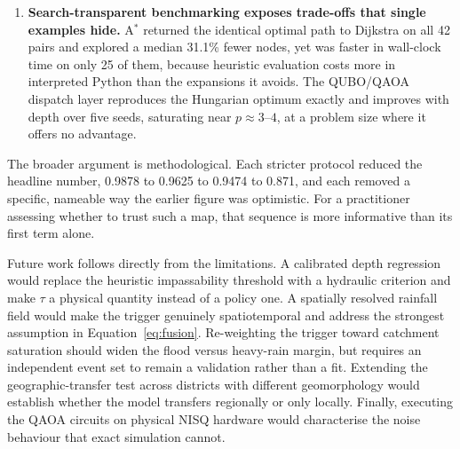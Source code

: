 \documentclass[journal]{IEEEtran}
\begin{document}
\begin{enumerate}
      pairs at $\tau\ge0.65$, $0.55$--$0.60$ and $\le0.50$. $\tau$ should be set
      by policy on acceptable risk, not by convention.
\item \textbf{Search-transparent benchmarking exposes trade-offs that single
      examples hide.} A$^\ast$ returned the identical optimal path to Dijkstra on
      all 42 pairs and explored a median 31.1\% fewer nodes, yet was faster in
      wall-clock time on only 25 of them, because heuristic evaluation costs more
      in interpreted Python than the expansions it avoids. The QUBO/QAOA dispatch
      layer reproduces the Hungarian optimum exactly and improves with depth
      over five seeds, saturating near $p\approx3$--$4$, at a problem size where
      it offers no advantage.
\end{enumerate}

The broader argument is methodological. Each stricter protocol reduced the
headline number, 0.9878 to 0.9625 to 0.9474 to 0.871, and each removed a specific,
nameable way the earlier figure was optimistic. For a practitioner assessing
whether to trust such a map, that sequence is more informative than its first term
alone.

Future work follows directly from the limitations. A calibrated depth regression
would replace the heuristic impassability threshold with a hydraulic criterion
and make $\tau$ a physical quantity instead of a policy one. A spatially
resolved rainfall field would make the trigger genuinely spatiotemporal and
address the strongest assumption in Equation~\eqref{eq:fusion}. Re-weighting the
trigger toward catchment saturation should widen the flood versus heavy-rain
margin, but requires an independent event set to remain a validation rather than
a fit. Extending the geographic-transfer test across districts with different
geomorphology would establish whether the model transfers regionally or only
locally. Finally, executing the QAOA circuits on physical NISQ hardware would
characterise the noise behaviour that exact simulation cannot.


\footnotesize
\end{document}
